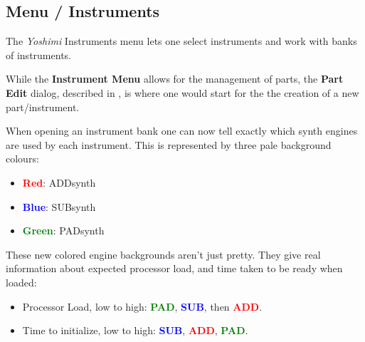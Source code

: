 %
%
%

\subsection{Menu / Instruments}
\label{subsec:menu_instrument}

   The \textsl{Yoshimi} Instruments menu lets one select instruments and work
   with banks of instruments.

   While the \textbf{Instrument Menu} allows for the management of parts, the
   \textbf{Part Edit} dialog, described in
   ,
   is where one would start for the the creation of a new part/instrument.

   When opening an instrument bank one can now tell exactly which synth engines
   are used by each instrument. This is represented by three pale background
   colours:

   \begin{itemize}
      \item \textbf{\textcolor{red}{Red}}: ADDsynth
      \item \textbf{\textcolor{blue}{Blue}}: SUBsynth
      \item \textbf{\textcolor{green}{Green}}: PADsynth
   \end{itemize}

   These new colored engine backgrounds aren't just pretty. They give real
   information about expected processor load, and time taken to be ready when
   loaded:

   \begin{itemize}
      \item Processor Load, low to high:
         \textbf{\textcolor{green}{PAD}},
         \textbf{\textcolor{blue}{SUB}}, then
         \textbf{\textcolor{red}{ADD}}.
      \item Time to initialize, low to high:
         \textbf{\textcolor{blue}{SUB}},
         \textbf{\textcolor{red}{ADD}},
         \textbf{\textcolor{green}{PAD}}.
   \end{itemize}

